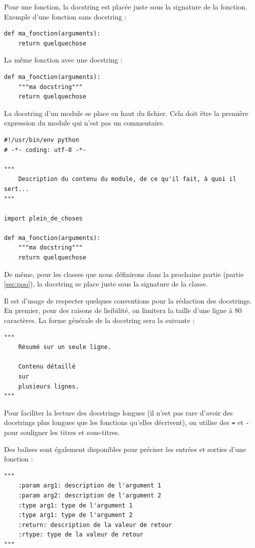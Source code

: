 \documentclass[12pt, a4paper]{article}
\begin{document}
Pour une fonction, la docstring est placée juste sous la signature de la fonction. Exemple d'une fonction sans docstring :
\begin{lstlisting}
def ma_fonction(arguments):
    return quelquechose
\end{lstlisting}

La même fonction avec une docstring :
\begin{lstlisting}
def ma_fonction(arguments):
	"""ma docstring"""
	return quelquechose
\end{lstlisting}

La docstring d'un module se place en haut du fichier. Cela doit être la première expression du module qui n'est pas un commentaire.
\begin{lstlisting}
#!/usr/bin/env python
# -*- coding: utf-8 -*-

"""
    Description du contenu du module, de ce qu'il fait, à quoi il sert...
"""

import plein_de_choses

def ma_fonction(arguments):
    """ma docstring"""
    return quelquechose

\end{lstlisting}

De même, pour les classes que nous définirons dans la prochaine partie (partie \ref{sec:poo}), la docstring se place juste sous la signature de la classe.

Il est d'usage de respecter quelques conventions pour la rédaction des docstrings. En premier, pour des raisons de lisibilité, on limitera la taille d'une ligne à 80 caractères. La forme générale de la docstring sera la suivante :
\begin{lstlisting}
"""
    Résumé sur un seule ligne.
	
    Contenu détaillé
    sur
    plusieurs lignes.
"""
\end{lstlisting}

Pour faciliter la lecture des docstrings longues (il n'est pas rare d'avoir des docstrings plus longues que les fonctions qu'elles décrivent), on utilise des \lstinline{=} et \lstinline{-} pour souligner les titres et sous-titres.

Des balises sont également disponibles pour préciser les entrées et sorties d'une fonction :
\begin{lstlisting}
"""
    :param arg1: description de l'argument 1
    :param arg2: description de l'argument 2
    :type arg1: type de l'argument 1
    :type arg1: type de l'argument 2
    :return: description de la valeur de retour
    :rtype: type de la valeur de retour
"""
\end{lstlisting}
\end{document}
